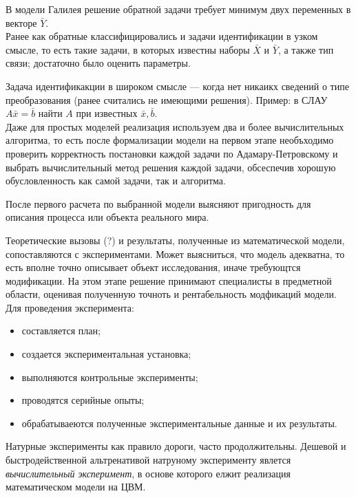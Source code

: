 \documentclass[12pt]{article}
\begin{document}
В модели Галилея решение обратной задачи требует минимум двух переменных в векторе $\bar{Y}$.\\

Ранее как обратные классифицировались и задачи идентификации в узком смысле, то есть такие задачи, в которых известны наборы $\bar{X}$ и $\bar{Y}$, а также тип связи; достаточно было оценить параметры.

Задача идентификакции в широком смысле --- когда нет никаикх сведений о типе преобразования (ранее считались не имеющими решения). Пример: в СЛАУ $A\bar{x} = \bar{b}$ найти $A$ при известных $\bar{x}, \bar{b}$.\\


Даже для простых моделей реализация используем два и более вычислительных алгоритма, то есть после формализации модели на первом этапе необъходимо проверить корректность постановки каждой задачи по Адамару-Петровскому и выбрать вычислительный метод решения каждой задачи, обсеспечив хорошую обусловленность как самой задачи, так и алгоритма.

После первого расчета по выбранной модели выясняют пригодность для описания процесса или объекта реального мира.\

Теоретические вызовы (?) и результаты, полученные из математической модели, сопоставляются с экспериментами. Может выясниться, что модель адекватна, то есть вполне точно описывает объект исследования, иначе требующтся модификации. На этом этапе решение принимают специалисты в предметной области, оценивая полученную точноть и рентабельность модфикаций модели.\\

Для проведения эксперимента:
\begin{itemize}
    \item составляется план;
    \item создается экспериментальная установка;
    \item выполняются контрольные эксперименты;
    \item проводятся серийные опыты;
    \item обрабатываеются полученные экспериментальные данные и их результаты.
\end{itemize}

Натурные эксперименты как правило дороги, часто продолжительны. Дешевой и быстродейственной альтренативой натруному эксперименту явлется \emph{вычислительный эксперимент}, в основе которого елжит реализация математическом модели на ЦВМ.
\end{document}
